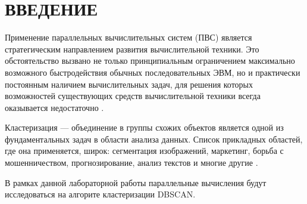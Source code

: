 {\centering \chapter*{ВВЕДЕНИЕ}}

Применение параллельных вычислительных систем (ПВС) является стратегическим направлением развития вычислительной техники.
Это обстоятельство вызвано не только принципиальным ограничением максимально возможного быстродействия обычных последовательных ЭВМ, но и практически постоянным наличием вычислительных задач, для решения которых возможностей существующих средств вычислительной техники всегда оказывается недостаточно \cite{intro-1}.

Кластеризация --- объединение в группы схожих объектов является одной из фундаментальных задач в области анализа данных.
Список прикладных областей, где она применяется, широк: сегментация изображений, маркетинг, борьба с мошенничеством, прогнозирование, анализ текстов и многие другие \cite{intro-2}.

В рамках данной лабораторной работы параллельные вычисления будут исследоваться на алгорите кластеризации DBSCAN.